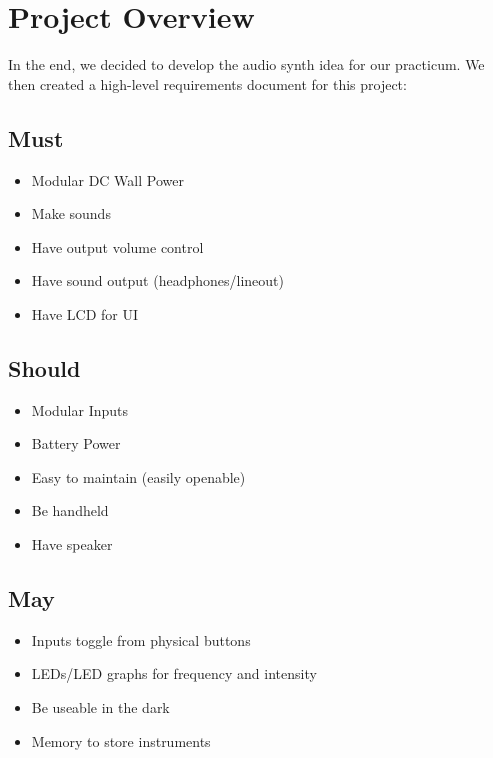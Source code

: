 \documentclass{article}
\begin{document}
\section {Project Overview}

In the end, we decided to develop the audio synth idea for our
practicum. We then created a high-level requirements document for this
project:

\subsection{Must}
\begin{itemize}
\item Modular DC Wall Power
\item Make sounds
\item Have output volume control
\item Have sound output (headphones/lineout)
\item Have LCD for UI
\end{itemize}
\subsection{Should}
\begin{itemize}
\item Modular Inputs 
\item Battery Power
\item Easy to maintain (easily openable)
\item Be handheld
\item Have speaker
\end{itemize}
\subsection{May}
\begin{itemize}
\item Inputs toggle from physical buttons
\item LEDs/LED graphs for frequency and intensity
\item Be useable in the dark
\item Memory to store instruments
\end{itemize}
\end{document}
